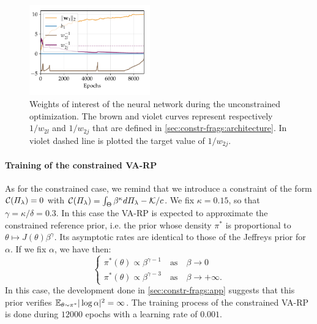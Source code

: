 \begin{figure}[h]
    \centering
    \includegraphics[width=5.2cm]{figures/constr-frags/weights_unconstr.pdf}
    \caption{
        Weights of interest of the neural network during the unconstrained optimization. %
    The brown and violet curves represent respectively $1/w_{2l}$ and $1/w_{2j}$ that are defined in \cref{sec:constr-frags:architecture}. In violet dashed line is plotted the target value of $1/w_{2j}$. %
    }
    \label{fig:unconstr_weights}
\end{figure}



\paragraph{Training of the constrained VA-RP}
As for the constrained case, we remind that we introduce a constraint of the form $\mathcal{C}(\varPi_\lambda)=0$ with  $\mathcal{C}(\varPi_\lambda) = \int_\Theta \beta^\kappa d\varPi_\lambda - \mathcal{K}/c$.
We fix $\kappa=0.15$, so that $\gamma=\kappa/\delta=0.3$.
In this case the VA-RP is expected to approximate the constrained reference prior, i.e. the prior whose density  $\pi^\ast$ is proportional to $\theta\mapsto J(\theta)\beta^\gamma$.
Its asymptotic rates are identical to those of the Jeffreys prior for $\alpha$. If we fix $\alpha$, we have then:
\begin{equation} 
\begin{cases} \displaystyle
\pi^\ast(\theta) \propto \beta^{\gamma -1} \quad \text{as} \quad  \beta \longrightarrow 0 \\
\pi^\ast(\theta) \propto \beta^{\gamma - 3} \quad \text{as} \quad  \beta \longrightarrow +\infty.
\end{cases} 
\end{equation} 
In this case, the development done in \cref{sec:constr-frags:app} suggests that this prior verifies $\mathbb{E}_{\theta\sim\pi^\ast}|\log\alpha|^2=\infty$.
The training process of the constrained VA-RP is done during $12000$ epochs with a learning rate of $0.001$. %



